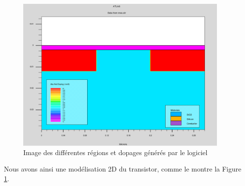 \documentclass[a4paper,11pt]{report}
\begin{document}

\begin{figure}
\centering
\includegraphics[width=300pt]{Simu1-Dopage.png}
\caption{Image des différentes régions et dopages générés par le logiciel}
\label{transistortonyplot}
\end{figure}

Nous avons ainsi une modélisation 2D du transistor, comme le montre la Figure \ref{transistortonyplot}.
\end{document}
